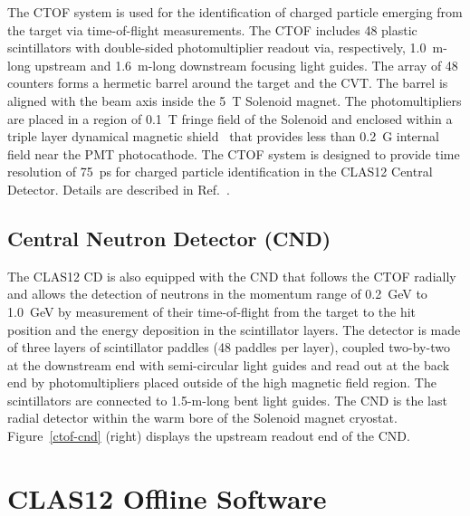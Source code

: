 \documentclass[final,3p,twocolumn]{elsarticle}
\begin{document}
The CTOF system is used for the identification of charged particle emerging from the target via time-of-flight
measurements. The CTOF includes 48 plastic scintillators with double-sided photomultiplier readout via, respectively,
1.0~m-long upstream and 1.6~m-long downstream focusing light guides. The array of 48 counters forms a hermetic barrel
around the target and the CVT. The barrel is aligned with the beam axis inside the 5~T Solenoid magnet. The 
photomultipliers are placed in a region of 0.1~T fringe field of the Solenoid and enclosed within a triple layer dynamical
magnetic shield~\cite{Baturin:2012zz} that provides less than 0.2~G internal field near the PMT photocathode. The CTOF
system is designed to provide time resolution of 75~ps for charged particle identification in the CLAS12 Central Detector.
Details are described in Ref.~\cite{CTOF}.  

\subsection{Central Neutron Detector (CND)}

The CLAS12 CD is also equipped with the CND that follows the CTOF radially and allows the detection of neutrons in
the momentum range of 0.2~GeV to 1.0~GeV by measurement of their time-of-flight from the target to the hit
position and the energy deposition in the scintillator layers. The detector is made of three layers of scintillator paddles
(48 paddles per layer), coupled two-by-two at the downstream end with semi-circular light guides and read out at the
back end by photomultipliers placed outside of the high magnetic field region. The scintillators are connected to 1.5-m-long
bent light guides. The CND is the last radial detector within the warm bore of the Solenoid magnet cryostat. 
Figure~\ref{ctof-cnd} (right) displays the upstream readout end of the CND. 

\section{CLAS12 Offline Software}  
\end{document}
